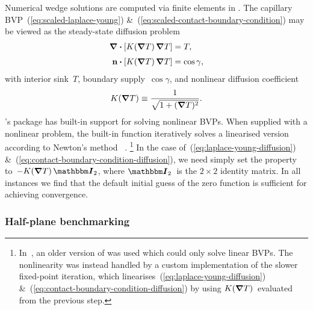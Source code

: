Numerical wedge solutions are computed
via finite elements in .
The capillary BVP~(\ref{eq:scaled-laplace-young})
\&~(\ref{eq:scaled-contact-boundary-condition})
may be viewed as the steady-state diffusion problem
\begin{align}
  \del \dotp \squarebr[\bulkysize]{K (\del T) \del T} &= T,
    \label{eq:laplace-young-diffusion}
    \\[\tallspace]
  \normalvec \dotp \squarebr[\bulkysize]{K (\del T) \del T} &= \cos\gamma,
  \label{eq:contact-boundary-condition-diffusion}
\end{align}
with interior sink~$T$, boundary supply~$\cos\gamma$,
and nonlinear diffusion coefficient
\begin{equation}
  K (\mathop{}\!\boldsymbol{\mathbf{\nabla}} T) \equiv \frac{1}{\sqrt{1 + (\mathop{}\!\boldsymbol{\mathbf{\nabla}} T)^2}}.
  \label{eq:laplace-young-diffusion-coefficient}
\end{equation}
's  package
has built-in support for solving nonlinear BVPs.
When supplied with a nonlinear problem,
the built-in function 
iteratively solves a linearised version
according to Newton's method~%
  \cite{wolfram-2020-documentation-finite-element-programming}.%
\footnote{
  In~\cite{li-2017-thesis-rounding-capillary-wedge},
  an older version of  was used
  which could only solve linear BVPs.
  The nonlinearity was instead handled
  by a custom implementation of the slower fixed-point iteration,
  which linearises~(\ref{eq:laplace-young-diffusion})
  \&~(\ref{eq:contact-boundary-condition-diffusion})
  by using $K (\mathop{}\!\boldsymbol{\mathbf{\nabla}} T)$~evaluated from the previous step.
}
In the case of~(\ref{eq:laplace-young-diffusion})
\&~(\ref{eq:contact-boundary-condition-diffusion}),
we need simply set the  property
to~$-K (\del T) \idenmat[2]$,
where $\idenmat[2]$~is the $2 \times 2$ identity matrix.
In all instances
we find that the default initial guess of the zero function
is sufficient for achieving convergence.

\subsubsection{Half-plane benchmarking}
\label{sec:moderate.nonlinear.numerical.half-plane}

